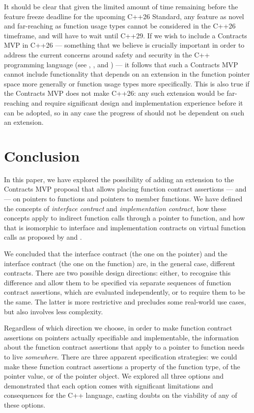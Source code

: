 It should be clear that given the limited amount of time remaining before the feature freeze deadline for the upcoming C++26 Standard, any feature as novel and far-reaching as function usage types cannot be considered in the C++26 timeframe, and will have to wait until C++29. If we wish to include a Contracts MVP in C++26 --- something that we believe is crucially important in order to address the current concerns around safety and security in the C++ programming language (see \cite{P3269R0}, \cite{P3276R0}, and \cite{P3297R0}) --- it follows that such a Contracts MVP cannot include functionality that depends on an extension in the function pointer space more generally or function usage types more specifically. This is also true if the Contracts MVP does not make C++26: any such extension would be far-reaching and require significant design and implementation experience before it can be adopted, so in any case the progress of \cite{P2900R7} should not be dependent on such an extension.

\section{Conclusion}

In this paper, we have explored the possibility of adding an extension to the Contracts MVP proposal \cite{P2900R7} that allows placing function contract assertions ---  and  --- on pointers to functions and pointers to member functions. We have defined the concepts of  \emph{interface contract} and  \emph{implementation contract}, how these concepts apply to indirect function calls through a pointer to function, and how that is isomorphic to interface and implementation contracts on virtual function calls as proposed by \cite{P3097R0} and \cite{P3165R0}.

We concluded that the interface contract (the one on the pointer) and the interface contract (the one on the function) are, in the general case, different contracts. There are two possible design directions: either, to recognise this difference and allow them to be specified via separate sequences of function contract assertions, which are evaluated independently, or to require them to be the same. The latter is more restrictive and precludes some real-world use cases, but also involves less complexity.

Regardless of which direction we choose, in order to make function contract assertions on pointers actually specifiable and implementable, the information about the function contract assertions that apply to a pointer to function needs to live \emph{somewhere}. There are three apparent specification strategies: we could make these function contract assertions a property of the function type, of the pointer value, or of the pointer object. We explored all three options and demonstrated that each option comes with significant limitations and consequences for the C++ language, casting doubts on the viability of any of these options.

